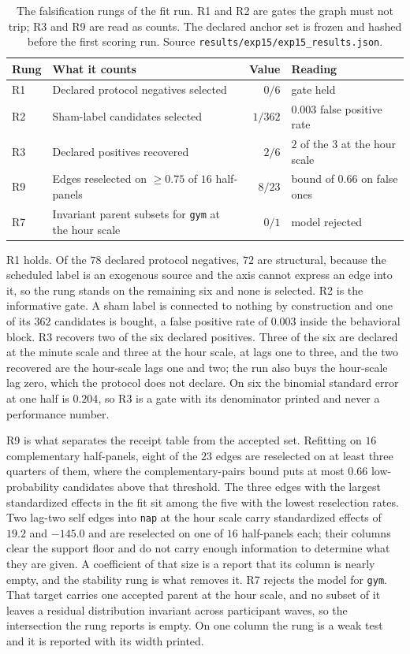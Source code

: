 \begin{table}[t]
\centering
\caption{The falsification rungs of the fit run. R1 and R2 are gates the graph
must not trip; R3 and R9 are read as counts. The declared anchor set is frozen
and hashed before the first scoring run. Source
\texttt{results/exp15/exp15\_results.json}.}
\label{tab:results:arm1_rungs}
\small
\begin{tabular}{llrl}
\toprule
Rung & What it counts & Value & Reading \\
\midrule
R1 & Declared protocol negatives selected & $0/6$ & gate held \\
R2 & Sham-label candidates selected & $1/362$ & $0.003$ false positive rate \\
R3 & Declared positives recovered & $2/6$ & $2$ of the $3$ at the hour scale \\
R9 & Edges reselected on $\ge 0.75$ of $16$ half-panels & $8/23$ & bound of $0.66$ on false ones \\
R7 & Invariant parent subsets for \texttt{gym} at the hour scale & $0/1$ & model rejected \\
\bottomrule
\end{tabular}
\end{table}

R1 holds. Of the $78$ declared protocol negatives, $72$ are structural, because
the scheduled label is an exogenous source and the axis cannot express an edge
into it, so the rung stands on the remaining six and none is selected. R2 is
the informative gate. A sham label is connected to nothing by construction and
one of its $362$ candidates is bought, a false positive rate of $0.003$ inside
the behavioral block. R3 recovers two of the six declared positives. Three of the
six are declared at the minute scale and three at the hour scale, at lags one to
three, and the two recovered are the hour-scale lags one and two; the run also
buys the hour-scale lag zero, which the protocol does not declare. On six the
binomial standard error at one half is $0.204$, so R3 is a gate with its
denominator printed and never a performance number.

R9 is what separates the receipt table from the accepted set. Refitting on
$16$ complementary half-panels, eight of the $23$ edges are reselected on at
least three quarters of them, where the complementary-pairs bound puts at most
$0.66$ low-probability candidates above that threshold. The three
edges with the largest standardized effects in the fit sit among the five with
the lowest reselection rates. Two lag-two self edges into \texttt{nap} at the
hour scale carry standardized effects of $19.2$ and $-145.0$ and are reselected
on one of $16$ half-panels each; their columns clear the support floor and do
not carry enough information to determine what they are given. A coefficient of that size
is a report that its column is nearly empty, and the stability rung is what
removes it. R7 rejects the model for \texttt{gym}. That target carries one
accepted parent at the hour scale, and no subset of it leaves a residual
distribution invariant across participant waves, so the intersection the rung
reports is empty. On one column the rung is a weak test and it is reported with
its width printed.

